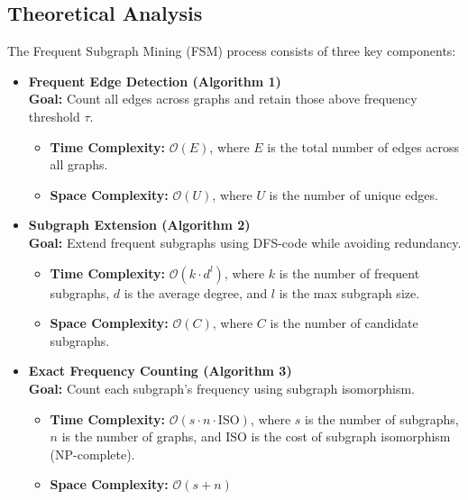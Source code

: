 \documentclass[11pt]{article}
\begin{document}
\subsection{Theoretical Analysis}
The Frequent Subgraph Mining (FSM) process consists of three key components:

\begin{itemize}[noitemsep]
    \item \textbf{Frequent Edge Detection (Algorithm 1)} \\
    \textbf{Goal:} Count all edges across graphs and retain those above frequency threshold $\tau$.
    \begin{itemize}[noitemsep]
        \item \textbf{Time Complexity:} $\mathcal{O}(E)$, where $E$ is the total number of edges across all graphs.
        \item \textbf{Space Complexity:} $\mathcal{O}(U)$, where $U$ is the number of unique edges.\\
    \end{itemize}
    
    \item \textbf{Subgraph Extension (Algorithm 2)} \\
    \textbf{Goal:} Extend frequent subgraphs using DFS-code while avoiding redundancy.
    \begin{itemize}[noitemsep]
        \item \textbf{Time Complexity:} $\mathcal{O}(k \cdot d^l)$, where $k$ is the number of frequent subgraphs, $d$ is the average degree, and $l$ is the max subgraph size.
        \item \textbf{Space Complexity:} $\mathcal{O}(C)$, where $C$ is the number of candidate subgraphs.\\
    \end{itemize}

    \item \textbf{Exact Frequency Counting (Algorithm 3)} \\
    \textbf{Goal:} Count each subgraph’s frequency using subgraph isomorphism.
    \begin{itemize}[noitemsep]
        \item \textbf{Time Complexity:} $\mathcal{O}(s \cdot n \cdot \text{ISO})$, where $s$ is the number of subgraphs, $n$ is the number of graphs, and $\text{ISO}$ is the cost of subgraph isomorphism (NP-complete).
        \item \textbf{Space Complexity:} $\mathcal{O}(s + n)$
    \end{itemize}
\end{itemize}
\end{document}
